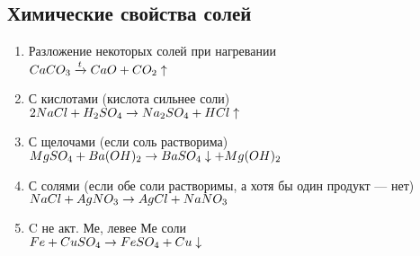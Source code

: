 \subsection{Химические свойства солей}
\begin{enumerate}
    \item Разложение некоторых солей при нагревании\\
        $CaCO_3 \xrightarrow{t} CaO + CO_2\uparrow$

    \item С кислотами (кислота сильнее соли)\\
        $2NaCl + H_2SO_4 \rightarrow Na_2SO_4 + HCl\uparrow$

    \item С щелочами (если соль растворима)\\
        $MgSO_4 + Ba(OH)_2 \rightarrow BaSO_4\downarrow + Mg(OH)_2$

    \item С солями (если обе соли растворимы, а хотя бы один продукт --- нет)\\
        $NaCl + AgNO_3 \rightarrow AgCl + NaNO_3$

    \item C не акт. Ме, левее Ме соли\\
        $Fe + CuSO_4 \rightarrow FeSO_4 + Cu\downarrow$
\end{enumerate}
